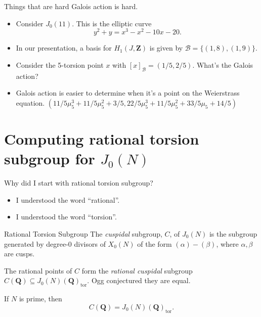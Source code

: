 \documentclass{beamer}
\newcommand{\QQ}{\mathbf{Q}}
\newcommand{\ZZ}{\mathbf{Z}}
\renewcommand{\ZZ}{\mathbf{Z}}
\newcommand{\tor}{\mathrm{tor}}
\begin{document}
\begin{frame}{Things that are hard}
    Galois action is hard.
    \begin{itemize}
        \item
            Consider $J_0(11)$. This is the elliptic curve
            \[
                y^2 + y = x^3 - x^2 - 10x - 20.
            \]
        \item
            In our presentation, a basis for $H_1(J, \ZZ)$ is given by
            $\mathcal{B}=\{(1,8), (1,9)\}$.
        \item
            Consider the 5-torsion point $x$ with $[x]_\mathcal{B}=(1/5, 2/5)$.
            What's the Galois action?
        \item
            Galois action is easier to determine when it's a point on the
            Weierstrass equation. $(11/5 \mu_5^3 + 11/5 \mu_5^2 + 3/5, 22/5
            \mu_5 ^3 + 11/5 \mu_5^2 + 33/5 \mu_5 + 14/5)$
    \end{itemize}
\end{frame}

\section{Computing rational torsion subgroup for $J_0(N)$}

\begin{frame}{Why did I start with rational torsion subgroup?}
    \begin{itemize}
        \item
            I understood the word ``rational''.
        \item
            I understood the word ``torsion''.
    \end{itemize}
\end{frame}


\begin{frame}{Rational Torsion Subgroup}
    The \emph{cuspidal} subgroup, $C$, of $J_0(N)$ is the subgroup generated by
    degree-0 divisors of $X_0(N)$ of the form $(\alpha)-(\beta)$, where
    $\alpha,\beta$ are cusps.

    The rational points of $C$ form the \emph{rational cuspidal} subgroup
    $C(\QQ)\subseteq J_0(N)(\QQ)_\tor$. Ogg conjectured they are equal.

    \begin{theorem}[Mazur '77]
        If $N$ is prime, then
        \[
            C(\QQ)=J_0(N)(\QQ)_\tor.
        \]
    \end{theorem}
\end{frame}
\end{document}
